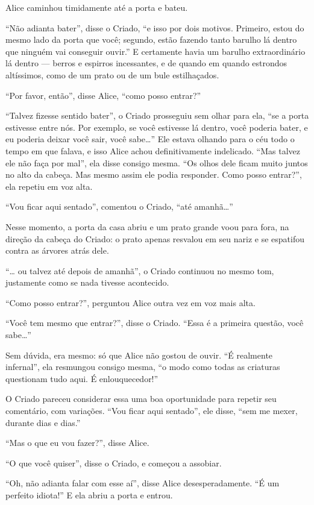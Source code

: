 Alice caminhou timidamente até a porta e bateu.

``Não adianta bater'', disse o Criado, ``e isso por dois motivos.
Primeiro, estou do mesmo lado da porta que você; segundo,
estão fazendo tanto barulho lá dentro que ninguém vai conseguir
ouvir.'' E certamente havia um barulho extraordinário lá dentro ---
berros e espirros incessantes, e de quando em quando estrondos
altíssimos, como de um prato ou de um bule estilhaçados.

``Por favor, então'', disse Alice, ``como posso entrar?''

``Talvez fizesse sentido bater'', o Criado prosseguiu sem olhar para
ela, ``se a porta estivesse entre nós. Por exemplo, se você estivesse lá
dentro, você poderia bater, e eu poderia deixar você sair, você
sabe\ldots{}'' Ele estava olhando para o céu todo o tempo em que falava, e
isso Alice achou definitivamente indelicado. ``Mas talvez ele não faça
por mal'', ela disse consigo mesma. ``Os olhos dele ficam muito juntos
no alto da cabeça. Mas mesmo assim ele podia responder. Como posso
entrar?'', ela repetiu em voz alta.

``Vou ficar aqui sentado'', comentou o Criado, ``até amanhã\ldots{}''

Nesse momento, a porta da casa abriu e um prato grande voou para fora,
na direção da cabeça do Criado: o prato apenas resvalou em seu nariz e
se espatifou contra as árvores atrás dele.

``\ldots{} ou talvez até depois de amanhã'', o Criado continuou no mesmo tom,
justamente como se nada tivesse acontecido.

``Como posso entrar?'', perguntou Alice outra vez em voz mais alta.

``Você tem mesmo que entrar?'', disse o Criado. ``Essa é a primeira
questão, você sabe\ldots{}''

Sem dúvida, era mesmo: só que Alice não gostou de ouvir. ``É realmente
infernal'', ela resmungou consigo mesma, ``o modo como todas as
criaturas questionam tudo aqui. É enlouquecedor!''

O Criado pareceu considerar essa uma boa oportunidade para repetir seu
comentário, com variações. ``Vou ficar aqui sentado'', ele disse, ``sem
me mexer, durante dias e dias.''

``Mas o que eu vou fazer?'', disse Alice.

``O que você quiser'', disse o Criado, e começou a assobiar.

``Oh, não adianta falar com esse aí'', disse Alice desesperadamente. ``É
um perfeito idiota!'' E ela abriu a porta e entrou.

